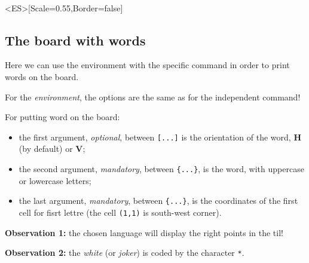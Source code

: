 \documentclass{article}
\newcommand\Cle[1]{{\bfseries\sffamily\textlangle #1\textrangle}}
\begin{document}
\begin{PresentationCode}{}
\ScrabbleBoard[Labels=false,Scale=0.55]\\      %
\ScrabbleBoard<ES>[Scale=0.55,Border=false]     %
\end{PresentationCode}

\newpage

\subsection{The board with words}

Here we can use the \textsf{environment} with the specific \textsf{command} in order to print words on the board.

\smallskip

For the \textit{environment}, the options are the same as for the independent \textsf{command}!

\smallskip

For putting word on the board:

\begin{itemize}
	\item the first argument, \textit{optional}, between \texttt{[...]} is the orientation of the word, \Cle{H} (by default) or \Cle{V};
	\item the second argument, \textit{mandatory}, between \texttt{\{...\}}, is the word, with uppercase or lowercase letters;
	\item the last argument, \textit{mandatory}, between \texttt{\{...\}}, is the coordinates of the first cell for fisrt lettre (the cell \texttt{(1,1)} is south-west corner).
\end{itemize}

\textbf{Observation 1:} the chosen language will display the right points in the til!

\smallskip

\textbf{Observation 2:} the \textit{white} (or \textit{joker}) is coded by the character \texttt{*}.

\begin{PresentationCode}{}
\begin{EnvScrabble}[Scale=0.75,Labels=false,Help]
\end{EnvScrabble}
\end{PresentationCode}
\end{document}
